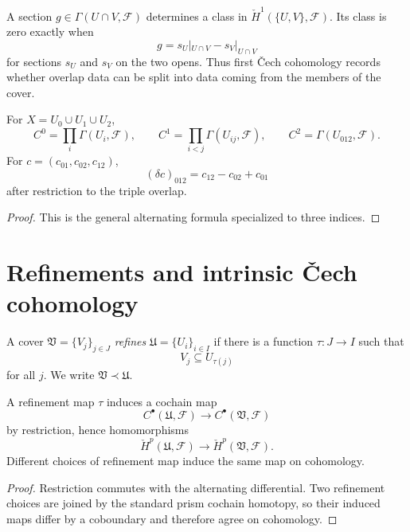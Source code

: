 \begin{example}\label{ex:vi47-two-open-obstruction}
A section $g\in\Gamma(U\cap V,\mathcal F)$ determines a class in $\check H^1(\{U,V\},\mathcal F)$.  Its class is zero exactly when
\[
g=s_U|_{U\cap V}-s_V|_{U\cap V}
\]
for sections $s_U$ and $s_V$ on the two opens.  Thus first \v{C}ech cohomology records whether overlap data can be split into data coming from the members of the cover.
\end{example}


\begin{proposition}\label{prop:vi47-three-open}
For $X=U_0\cup U_1\cup U_2$,
\[
C^0=\prod_i\Gamma(U_i,\mathcal F),\qquad
C^1=\prod_{i<j}\Gamma(U_{ij},\mathcal F),\qquad
C^2=\Gamma(U_{012},\mathcal F).
\]
For $c=(c_{01},c_{02},c_{12})$,
\[
(\delta c)_{012}=c_{12}-c_{02}+c_{01}
\]
after restriction to the triple overlap.
\begin{proof}
This is the general alternating formula specialized to three indices.
\end{proof}
\end{proposition}

\section{Refinements and intrinsic \v{C}ech cohomology}

\begin{definition}\label{def:vi47-refinement}
A cover $\mathfrak V=\{V_j\}_{j\in J}$ \emph{refines} $\mathfrak U=\{U_i\}_{i\in I}$ if there is a function $\tau:J\to I$ such that
\[
V_j\subseteq U_{\tau(j)}
\]
for all $j$.  We write $\mathfrak V\prec\mathfrak U$.
\end{definition}

\begin{theorem}\label{thm:vi47-refinement-map}
A refinement map $\tau$ induces a cochain map
\[
C^\bullet(\mathfrak U,\mathcal F)\longrightarrow C^\bullet(\mathfrak V,\mathcal F)
\]
by restriction, hence homomorphisms
\[
\check H^p(\mathfrak U,\mathcal F)\longrightarrow\check H^p(\mathfrak V,\mathcal F).
\]
Different choices of refinement map induce the same map on cohomology.
\begin{proof}
Restriction commutes with the alternating differential.  Two refinement choices are joined by the standard prism cochain homotopy, so their induced maps differ by a coboundary and therefore agree on cohomology.
\end{proof}
\end{theorem}

